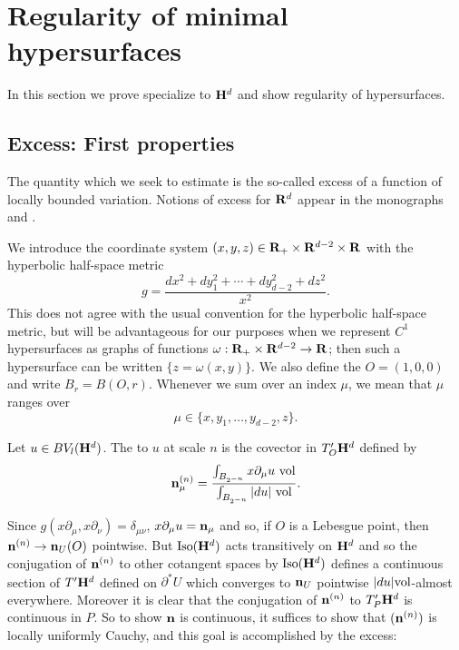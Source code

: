 \section{Regularity of minimal hypersurfaces}\label{DeGiorgiSection}
In this section we prove specialize to $\mathbf H^d$ and show regularity of hypersurfaces.

\subsection{Excess: First properties}
The quantity which we seek to estimate is the so-called excess of a function of locally bounded variation.
Notions of excess for $\mathbf{R}^d$ appear in the monographs \cite[\S5.3.1]{federer2014geometric} and \cite[Chapter 6]{Giusti77}.

We introduce the coordinate system $(x, y, z) \in \mathbf{R}_+ \times \mathbf{R}^{d - 2} \times \mathbf{R}$ with the hyperbolic half-space metric
\begin{equation}\label{hyperbolic metric}
g = \frac{dx^2 + dy_1^2 + \cdots + dy_{d - 2}^2 + dz^2}{x^2}.
\end{equation}
This does not agree with the usual convention for the hyperbolic half-space metric, but will be advantageous for our purposes when we represent $C^1$ hypersurfaces as graphs of functions $\omega: \mathbf{R}_+ \times \mathbf{R}^{d - 2} \to \mathbf{R}$; then such a hypersurface can be written $\{z = \omega(x, y)\}$.
We also define the  $O = (1, 0, 0)$ and write $B_r = B(O, r)$.
Whenever we sum over an index $\mu$, we mean that $\mu$ ranges over
$$\mu \in \{x, y_1, \dots, y_{d - 2}, z\}.$$

\begin{definition}
Let $u \in BV_l(\mathbf H^d)$. The  to $u$ at scale $n$ is the covector in $T_O' \mathbf H^d$ defined by
$$\mathbf n^{(n)}_\mu = \frac{\int_{B_{2^{-n}}} x \partial_\mu u ~\mathrm{vol}}{\int_{B_{2^{-n}}} |du| ~\mathrm{vol}}.$$
\end{definition}

Since $g(x\partial_\mu, x\partial_\nu) = \delta_{\mu\nu}$, $x\partial_\mu u = \mathbf n_\mu$ and so, if $O$ is a Lebesgue point, then $\mathbf n^{(n)} \to \mathbf n_U(O)$ pointwise.
But $\operatorname{Iso}(\mathbf H^d)$ acts transitively on $\mathbf H^d$ and so the conjugation of $\mathbf n^{(n)}$ to other cotangent spaces by $\operatorname{Iso}(\mathbf H^d)$ defines a continuous section of $T'\mathbf H^d$ defined on $\partial^* U$ which converges to $\mathbf n_U$ pointwise $|du|\mathrm{vol}$-almost everywhere.
Moreover it is clear that the conjugation of $\mathbf n^{(n)}$ to $T'_P\mathbf H^d$ is continuous in $P$.
So to show $\mathbf n$ is continuous, it suffices to show that $(\mathbf n^{(n)})$ is locally uniformly Cauchy, and this goal is accomplished by the excess:

